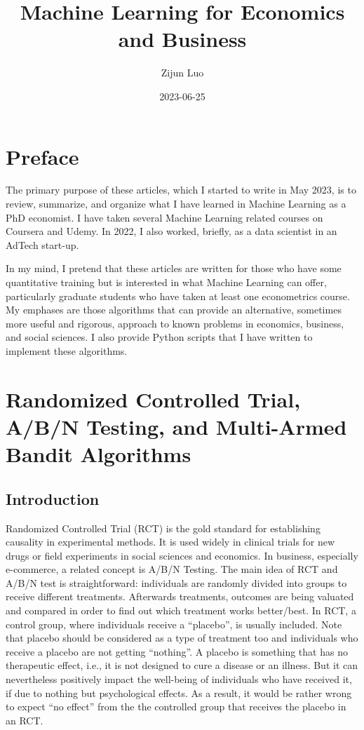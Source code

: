 \documentclass[
]{book}
\title{Machine Learning for Economics and Business}
\author{Zijun Luo}
\date{2023-06-25}
\theoremstyle{definition}
\theoremstyle{definition}
\theoremstyle{definition}
\theoremstyle{definition}
\theoremstyle{remark}
\begin{document}
\maketitle

{
\setcounter{tocdepth}{1}
\tableofcontents
}
\hypertarget{preface}{%
\chapter*{Preface}\label{preface}}

The primary purpose of these articles, which I started to write in May 2023, is to review, summarize, and organize what I have learned in Machine Learning as a PhD economist. I have taken several Machine Learning related courses on Coursera and Udemy. In 2022, I also worked, briefly, as a data scientist in an AdTech start-up.

In my mind, I pretend that these articles are written for those who have some quantitative training but is interested in what Machine Learning can offer, particularly graduate students who have taken at least one econometrics course. My emphases are those algorithms that can provide an alternative, sometimes more useful and rigorous, approach to known problems in economics, business, and social sciences. I also provide Python scripts that I have written to implement these algorithms.

\hypertarget{randomized-controlled-trial-abn-testing-and-multi-armed-bandit-algorithms}{%
\chapter{Randomized Controlled Trial, A/B/N Testing, and Multi-Armed Bandit Algorithms}\label{randomized-controlled-trial-abn-testing-and-multi-armed-bandit-algorithms}}

\hypertarget{introduction}{%
\section{Introduction}\label{introduction}}

Randomized Controlled Trial (RCT) is the gold standard for establishing causality in experimental methods. It is used widely in clinical trials for new drugs or field experiments in social sciences and economics. In business, especially e-commerce, a related concept is A/B/N Testing. The main idea of RCT and A/B/N test is straightforward: individuals are randomly divided into groups to receive different treatments. Afterwards treatments, outcomes are being valuated and compared in order to find out which treatment works better/best. In RCT, a control group, where individuals receive a ``placebo'', is usually included. Note that placebo should be considered as a type of treatment too and individuals who receive a placebo are not getting ``nothing''. A placebo is something that has no therapeutic effect, i.e., it is not designed to cure a disease or an illness. But it can nevertheless positively impact the well-being of individuals who have received it, if due to nothing but psychological effects. As a result, it would be rather wrong to expect ``no effect'' from the the controlled group that receives the placebo in an RCT.
\end{document}
